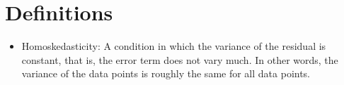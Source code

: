 \documentclass[11pt]{article}
\begin{document}
\section{Definitions}
\begin{itemize}
    \item Homoskedasticity: A condition in which the variance of the residual is constant, that
    is, the error term does not vary much. In other words, the variance of the data points is 
    roughly the same for all data points. 
\end{itemize}
\end{document}
